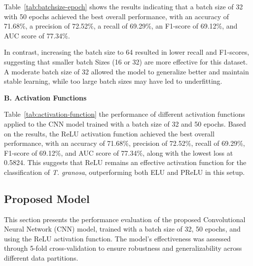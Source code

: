 Table~\ref{tab:batchsize-epoch} shows the results indicating that a batch size of 32 with 50 epochs achieved the best overall performance, with an accuracy of 71.68\%, a precision of 72.52\%, a recall of 69.29\%, an F1-score of 69.12\%, and AUC score of 77.34\%.

In contrast, increasing the batch size to 64 resulted in lower recall and F1-scores, suggesting that smaller batch Sizes (16 or 32) are more effective for this dataset. A moderate batch size of 32 allowed the model to generalize better and maintain stable learning, while too large batch sizes may have led to underfitting.

\newpage
\noindent\textbf{B. Activation Functions}

\begin{table}[H]
	\centering
	\caption{Performance metrics for different activation functions (Batch Size: 32, Epochs: 50).}
	\label{tab:activation-function}
\end{table}

Table~\ref{tab:activation-function} the performance of different activation functions applied to the CNN model trained with a batch size of 32 and 50 epochs. Based on the results, the ReLU activation function achieved the best overall performance, with an accuracy of 71.68\%, precision of 72.52\%, recall of 69.29\%, F1-score of 69.12\%, and AUC score of 77.34\%, along with the lowest loss at 0.5824. This suggests that ReLU remains an effective activation function for the classification of \textit{T. granosa}, outperforming both ELU and PReLU in this setup.

\subsection{Proposed Model}
This section presents the performance evaluation of the proposed Convolutional Neural Network (CNN) model, trained with a batch size of 32, 50 epochs, and using the ReLU activation function. The model’s effectiveness was assessed through 5-fold cross-validation to ensure robustness and generalizability across different data partitions. 

